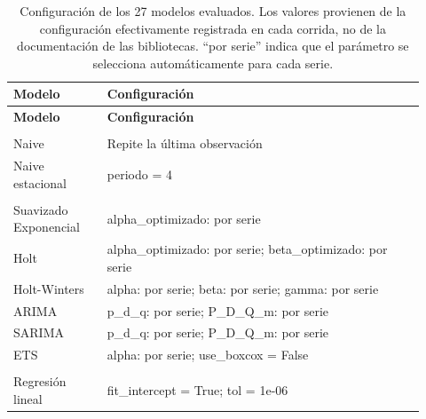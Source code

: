 \begin{longtable}{>{\raggedright\arraybackslash}p{0.21\linewidth}>{\raggedright\arraybackslash}p{0.71\linewidth}}
\caption{Configuración de los 27 modelos evaluados. Los valores provienen de la configuración efectivamente registrada en cada corrida, no de la documentación de las bibliotecas. ``por serie'' indica que el parámetro se selecciona automáticamente para cada serie.}\label{tab:hiperparametros}\\
\toprule
\textbf{Modelo} & \textbf{Configuración} \\
\midrule
\endfirsthead
\toprule
\textbf{Modelo} & \textbf{Configuración} \\
\midrule
\endhead
\bottomrule
\endfoot
\multicolumn{2}{l}{\textit{Referencia}} \\[1mm]
\hspace{.6em}Naive & Repite la última observación \\
\hspace{.6em}Naive estacional & periodo = 4 \\
\addlinespace
\multicolumn{2}{l}{\textit{Estadístico}} \\[1mm]
\hspace{.6em}Suavizado Exponencial & alpha\_optimizado: por serie \\
\hspace{.6em}Holt & alpha\_optimizado: por serie; beta\_optimizado: por serie \\
\hspace{.6em}Holt-Winters & alpha: por serie; beta: por serie; gamma: por serie \\
\hspace{.6em}ARIMA & p\_d\_q: por serie; P\_D\_Q\_m: por serie \\
\hspace{.6em}SARIMA & p\_d\_q: por serie; P\_D\_Q\_m: por serie \\
\hspace{.6em}ETS & alpha: por serie; use\_boxcox = False \\
\addlinespace
\multicolumn{2}{l}{\textit{Aprendizaje automático}} \\[1mm]
\hspace{.6em}Regresión lineal & fit\_intercept = True; tol = 1e-06 \\

\end{longtable}
